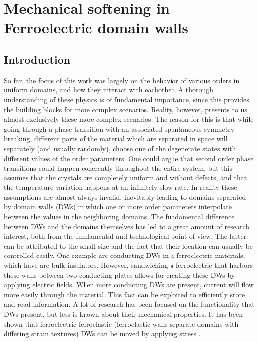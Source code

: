 \chapter{Mechanical softening in Ferroelectric domain walls}


\section{Introduction}
So far, the focus of this work was largely on the behavior of various orders in uniform domains, and how they interact with eachother.
A thorough understanding of these physics is of fundamental importance, since this provides the building blocks for more complex scenarios.
Reality, however, presents to us almost exclusively these more complex scenarios.
The reason for this is that while going through a phase transition with an associated spontaneous symmetry breaking, different parts of the material which are separated in space will separately (and usually randomly), choose one of the degenerate states with different values of the order parameters.
One could argue that second order phase transitions could happen coherently throughout the entire system, but this assumes that the crystals are completely uniform and without defects, and that the temperature variation happens at an infinitely slow rate.
In reality these assumptions are almost always invalid, inevitably leading to domains separated by domain walls (DWs) in which one or more order parameters interpolate between the values in the neighboring domains.
The fundamental difference between DWs and the domains themselves has led to a great amount of research interest, both from the fundamental and technological point of view.
The latter can be attributed to the small size and the fact that their location can usually be controlled easily.
One example are conducting DWs in a ferroelectric materials, which have are bulk insulators.
However, sandwiching a ferroelectric that harbors these walls between two conducting plates allows for creating these DWs by applying electric fields.
When more conducting DWs are present, current will flow more easily through the material.
This fact can be exploited to efficiently store and read information.
A lot of research has been focused on the functionality that DWs present, but less is known about their mechanical properties.
It has been shown that ferroelectric-ferroelastic (ferroelastic walls separate domains with differing strain textures) DWs can be moved by applying stress \cite{Schneider2001}.
